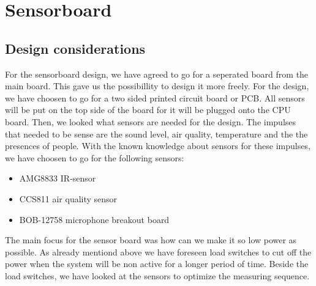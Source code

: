\documentclass[11pt,a4paper]{article}
\begin{document}
\section{Sensorboard}
\subsection{Design considerations}
For the sensorboard design, we have agreed to go for a seperated board from the main board. This gave us the possibillity to design it more freely. For the design, we have choosen to go for a two sided printed circuit board or PCB. All sensors will be put on the top side of the board for it will be plugged onto the CPU board. Then, we looked what sensors are needed for the design. The impulses that needed to be sense are the sound level, air quality, temperature and the the presences of people.
With the known knowledge about sensors for these impulses, we have choosen to go for the following sensors:

\begin{itemize}
	\item AMG8833 IR-sensor
	\item CCS811 air quality sensor
	\item BOB-12758 microphone breakout board
\end{itemize}
The main focus for the sensor board was how can we make it so low power as possible. As already mentiond above we have foreseen load switches to cut off the power when the system will be non active for a longer period of time. Beside the load switches, we have looked at the sensors to optimize the measuring sequence.
\end{document}
